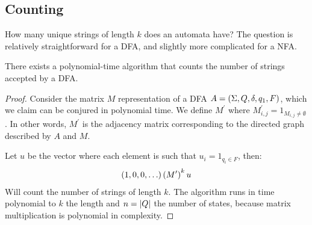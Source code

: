 \subsection{Counting}
How many unique strings of length \(k\) does an automata have?
The question is relatively straightforward for a DFA,
and slightly more complicated for a NFA.

\begin{theorem}
  There exists a polynomial-time algorithm that counts the number of strings
  accepted by a DFA.
\end{theorem}
\begin{proof}
  Consider the matrix \(M\) representation of a
  DFA \(A = \left(\Sigma, Q, \delta, q_1, F\right)\),
  which we claim can be conjured in polynomial time.
  We define \(M^\prime\)
  where \(M^\prime _{i, j} = 1_{M_{i, j} \neq \emptyset}\).
  In other words, \(M^\prime\) is the adjacency
  matrix corresponding to the directed graph described by \(A\) and \(M\).

  Let \(u\) be the vector where each element is such that
  \(u_i = 1_{q_i \in F}\), then:
  \begin{align*}
    \left(1, 0, 0, \ldots\right) \left(M^\prime\right)^k u
  \end{align*}
  Will count the number of strings of length \(k\).
  The algorithm runs in time polynomial to \(k\) the length
  and \(n = \left\lvert Q\right\rvert\) the number of states,
  because matrix multiplication is polynomial in complexity.
\end{proof}



